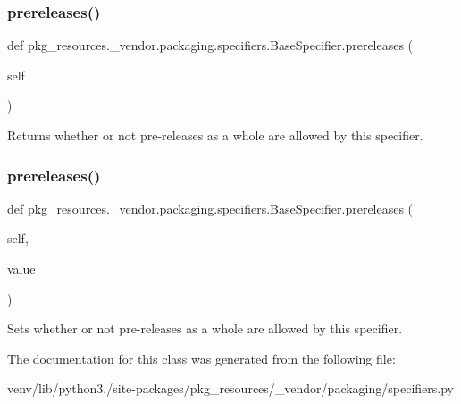 \subsubsection{\texorpdfstring{prereleases()}{prereleases()}\hspace{0.1cm}{\footnotesize\ttfamily [1/2]}}
{\footnotesize\ttfamily def pkg\+\_\+resources.\+\_\+vendor.\+packaging.\+specifiers.\+Base\+Specifier.\+prereleases (\begin{DoxyParamCaption}\item[{}]{self }\end{DoxyParamCaption})}

\begin{DoxyVerb}Returns whether or not pre-releases as a whole are allowed by this
specifier.
\end{DoxyVerb}
 \mbox{\label{classpkg__resources_1_1__vendor_1_1packaging_1_1specifiers_1_1_base_specifier_a897a6a62cda3786551aab9e0b62f7da3}} 
\subsubsection{\texorpdfstring{prereleases()}{prereleases()}\hspace{0.1cm}{\footnotesize\ttfamily [2/2]}}
{\footnotesize\ttfamily def pkg\+\_\+resources.\+\_\+vendor.\+packaging.\+specifiers.\+Base\+Specifier.\+prereleases (\begin{DoxyParamCaption}\item[{}]{self,  }\item[{}]{value }\end{DoxyParamCaption})}

\begin{DoxyVerb}Sets whether or not pre-releases as a whole are allowed by this
specifier.
\end{DoxyVerb}
 

The documentation for this class was generated from the following file\+:\begin{DoxyCompactItemize}
\item 
venv/lib/python3./site-\/packages/pkg\+\_\+resources/\+\_\+vendor/packaging/specifiers.\+py\end{DoxyCompactItemize}
